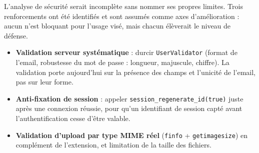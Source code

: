 L'analyse de sécurité serait incomplète sans nommer ses propres limites. Trois renforcements ont
été identifiés et sont assumés comme axes d'amélioration : aucun n'est bloquant pour l'usage visé,
mais chacun élèverait le niveau de défense.
\begin{itemize}
  \item \textbf{Validation serveur systématique} : durcir \texttt{UserValidator} (format de
        l'email, robustesse du mot de passe : longueur, majuscule, chiffre). La validation porte
        aujourd'hui sur la présence des champs et l'unicité de l'email, pas sur leur forme.
  \item \textbf{Anti-fixation de session} : appeler \texttt{session\_regenerate\_id(true)} juste
        après une connexion réussie, pour qu'un identifiant de session capté avant
        l'authentification cesse d'être valable.
  \item \textbf{Validation d'upload par type MIME réel} (\texttt{finfo} + \texttt{getimagesize})
        en complément de l'extension, et limitation de la taille des fichiers.
\end{itemize}

